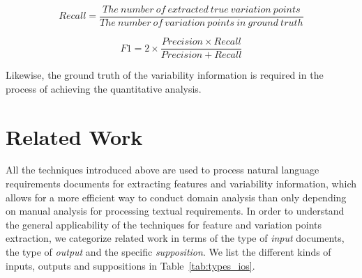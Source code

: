 \documentclass[graybox]{svmult}
\begin{document}
\begin{equation}
Recall = \frac{The\ number\ of\ extracted\ true\ variation\ points}{ The\ number\ of\ variation\ points\ in\ ground\ truth}
\end{equation}

\begin{equation}
F1 = 2 \times \frac{Precision \times Recall}{Precision + Recall}
\end{equation}

Likewise, the ground truth of the variability information is required in the process of achieving the quantitative analysis.


\section{Related Work}
All the techniques introduced above are used to process natural language requirements documents for extracting features and variability information, which allows for a more efficient way to conduct domain analysis than only depending on manual analysis for processing textual requirements.
In order to understand the general applicability of the techniques for feature and variation points extraction, we categorize related work in terms of the type of \textit{input} documents, the type of \textit{output} and the specific \textit{supposition}. We list the different kinds of inputs, outputs and suppositions in Table~\ref{tab:types_ios}.
\end{document}
